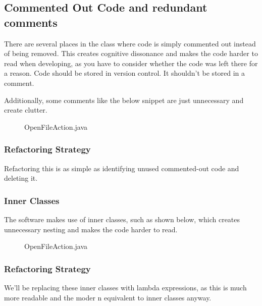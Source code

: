 \subsection{Commented Out Code and redundant comments}
There are several places in the class where code is simply commented out instead of being removed. This creates cognitive dissonance and makes the code harder to read when developing, as you have to consider whether the code was left there for a reason. Code should be stored in version control. It shouldn't be stored in a comment.

Additionally, some comments like the below snippet are just unnecessary and create clutter.

\begin{figure}[H]
  
  \caption{OpenFileAction.java}
\end{figure}

\subsubsection{Refactoring Strategy}
Refactoring this is as simple as identifying unused commented-out code and deleting it.

\subsubsection{Inner Classes}
The software makes use of inner classes, such as shown below, which creates unnecessary nesting and makes the code harder to read.

\begin{figure}[H]
  
  \caption{OpenFileAction.java}
\end{figure}
\subsubsection{Refactoring Strategy}
We'll be replacing these inner classes with lambda expressions, as this is much more readable and the moder
n equivalent to inner classes anyway.